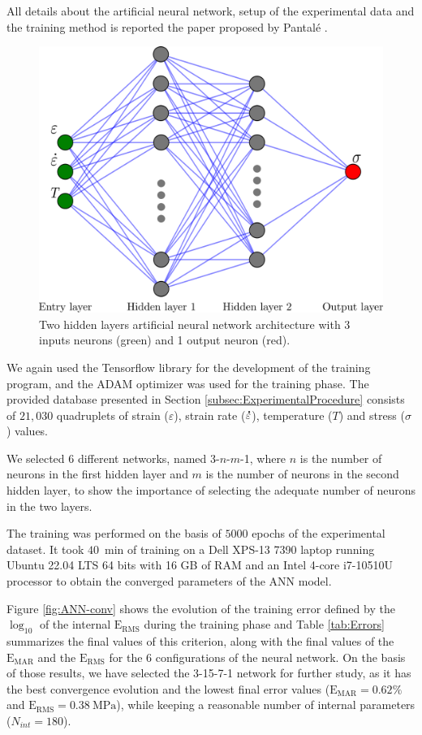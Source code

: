\documentclass[metals,article,submit,pdftex,moreauthors]{Definitions/mdpi}
\DeclareRobustCommand{\mdot}[1]{\accentset{\mbox{\bfseries .}}{#1}}
\DeclareRobustCommand{\RMSE}{\text{E}_\text{RMS}}
\DeclareRobustCommand{\MARE}{\text{E}_\text{MAR}}
\DeclareRobustCommand{\MPa}{\text{MPa}}
\begin{document}
All details about the artificial neural network, setup of the experimental data and the training method is reported the paper proposed by Pantalé \cite{Pantale-2023}.

\begin{figure}[H]
\includegraphics[width=0.55\columnwidth]{Figures/ANN-scheme-2HL}
\caption{Two hidden layers artificial neural network architecture with 3 inputs neurons (green) and 1 output neuron (red).}
\label{fig:ANN-2HL}
\end{figure}

We again used the Tensorflow library for the development of the training program, and the ADAM optimizer was used for the training phase.
The provided database presented in Section \ref{subsec:ExperimentalProcedure} consists of $21,030$ quadruplets of strain ($\varepsilon$), strain rate ($\mdot\varepsilon$), temperature ($T$) and stress ($\sigma$) values.

We selected 6 different networks, named 3-$n$-$m$-1, where $n$ is the number of neurons in the first hidden layer and $m$ is the number of neurons in the second hidden layer, to show the importance of selecting the adequate number of neurons in the two layers.

The training was performed on the basis of $5000$ epochs of the experimental dataset.
It took $40$~min of training on a Dell XPS-13 7390 laptop running Ubuntu 22.04 LTS 64 bits with 16 GB of RAM and an Intel 4-core i7-10510U processor to obtain the converged parameters of the ANN model.

Figure \ref{fig:ANN-conv} shows the evolution of the training error defined by the $\log_{10}$ of the internal $\RMSE$ during the training phase and Table \ref{tab:Errors} summarizes the final values of this criterion, along with the final values of the $\MARE$ and the $\RMSE$ for the 6 configurations of the neural network.
On the basis of those results, we have selected the 3-15-7-1 network for further study, as it has the best convergence evolution and the lowest final error values ($\MARE=0.62\%$ and $\RMSE=0.38~\MPa$), while keeping a reasonable number of internal parameters ($N_{int}=180$).
\end{document}
